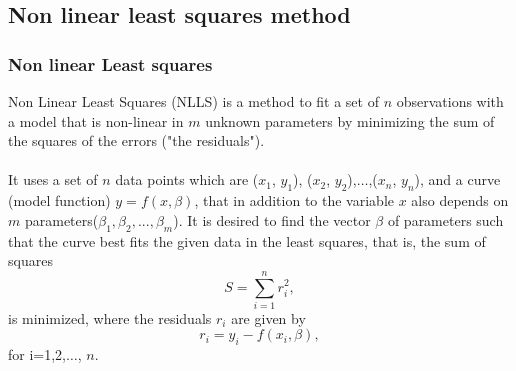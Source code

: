 \documentclass[a4paper,10pt]{report}
\begin{document}
\subsection{\textbf{Non linear least squares method}}
\subsubsection{Non linear Least squares}
Non Linear Least Squares (NLLS) is a method to fit a set of $n$ observations with a model that is non-linear in $m$ unknown parameters by minimizing the sum of the squares of the errors ("the residuals").
\paragraph*{}
It uses a set of $n$ data points which are ($x_1$, $y_1$), ($x_2$, $y_2$),$\dots$,($x_n$, $y_n$), and a curve (model function) $y= f(x, \beta)$, that in addition to the variable $x$ also depends on $m$ parameters($\beta_1,\beta_2,...,\beta_m$).
It is desired to find the vector $\beta$ of parameters such that the curve best fits the given data in the least squares, that is, the sum of squares
\begin{equation}
    S=\sum_{i=1}^{n}r_i^2 ,
\end{equation}
is minimized, where the residuals $r_i$ are given by
\begin{equation}
    r_i = y_i - f(x_i,\beta),
\end{equation}
for i=1,2,$\dots$, $n$.
\end{document}
